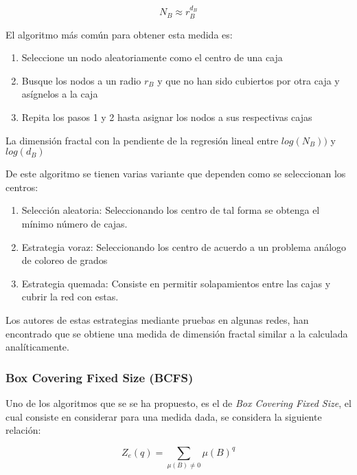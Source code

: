 \begin{equation}
    N_B \approx r_B^{d_B}
\end{equation}

El algoritmo más común para obtener esta medida es:

\begin{enumerate}
    \item Seleccione un nodo aleatoriamente como el centro de una caja
    \item Busque los nodos a un radio $r_B$ y que no han sido cubiertos por otra caja y asígnelos a la caja
    \item Repita los pasos 1 y 2 hasta asignar los nodos a sus respectivas cajas
\end{enumerate}

La dimensión fractal con la pendiente de la regresión lineal entre $log(N_B))$ y $log(d_B)$

De este algoritmo se tienen varias variante que dependen como se seleccionan los centros:

\begin{enumerate}
    \item Selección aleatoria\cite{Kim2007B}: Seleccionando los centro de tal forma se obtenga el mínimo número de cajas.
    \item Estrategia voraz\cite{Song2007}: Seleccionando los centro de acuerdo a un problema análogo de coloreo de grados
    \item Estrategia quemada\cite{Song2007}: Consiste en permitir solapamientos entre las cajas  y cubrir la red con estas.
\end{enumerate}

Los autores de estas estrategias mediante pruebas en algunas redes, han encontrado que se obtiene una medida de dimensión fractal similar a la calculada analíticamente.



\subsubsection{Box Covering Fixed Size (BCFS)}

Uno de los algoritmos que se se ha propuesto, es el de \textit{Box Covering Fixed Size}\cite{Halsey1986}\cite{RendondelaTorre2017}\cite{Yu2003}, el cual consiste en considerar para una medida dada, se considera la siguiente relación:

\begin{equation}
    Z_e(q) =  \sum \limits_{\mu(B) \neq 0} \mu(B)^q
\end{equation}

